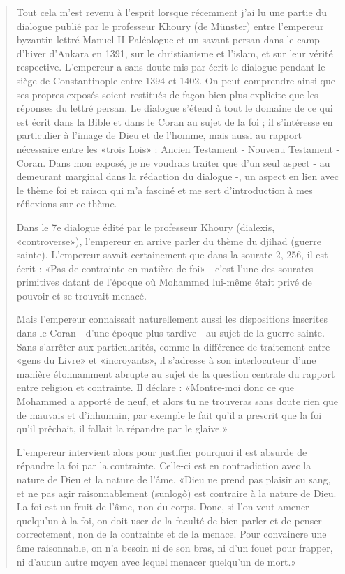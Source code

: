 \begin{quote}
Tout cela m'est revenu à l'esprit lorsque récemment j'ai lu une partie du dialogue publié par le professeur Khoury (de Münster) entre l'empereur byzantin lettré Manuel II Paléologue et un savant persan dans le camp d'hiver d'Ankara en 1391, sur le christianisme et l'islam, et sur leur vérité respective. L'empereur a sans doute mis par écrit le dialogue pendant le siège de Constantinople entre 1394 et 1402. On peut comprendre ainsi que ses propres exposés soient restitués de façon bien plus explicite que les réponses du lettré persan. Le dialogue s'étend à tout le domaine de ce qui est écrit dans la Bible et dans le Coran au sujet de la foi ; il s'intéresse en particulier à l'image de Dieu et de l'homme, mais aussi au rapport nécessaire entre les «trois Lois» : Ancien Testament - Nouveau Testament - Coran. Dans mon exposé, je ne voudrais traiter que d'un seul aspect - au demeurant marginal dans la rédaction du dialogue -, un aspect en lien avec le thème foi et raison qui m'a fasciné et me sert d'introduction à mes réflexions sur ce thème.

Dans le 7e dialogue édité par le professeur Khoury (dialexis, «controverse»), l'empereur en arrive parler du thème du djihad (guerre sainte). L'empereur savait certainement que dans la sourate 2, 256, il est écrit : «Pas de contrainte en matière de foi» - c'est l'une des sourates primitives datant de l'époque où Mohammed lui-même était privé de pouvoir et se trouvait menacé.

Mais l'empereur connaissait naturellement aussi les dispositions inscrites dans le Coran - d'une époque plus tardive - au sujet de la guerre sainte. Sans s'arrêter aux particularités, comme la différence de traitement entre «gens du Livre» et «incroyants», il s'adresse à son interlocuteur d'une manière étonnamment abrupte au sujet de la question centrale du rapport entre religion et contrainte. Il déclare : «Montre-moi donc ce que Mohammed a apporté de neuf, et alors tu ne trouveras sans doute rien que de mauvais et d'inhumain, par exemple le fait qu'il a prescrit que la foi qu'il prêchait, il fallait la répandre par le glaive.»

L'empereur intervient alors pour justifier pourquoi il est absurde de répandre la foi par la contrainte. Celle-ci est en contradiction avec la nature de Dieu et la nature de l'âme. «Dieu ne prend pas plaisir au sang, et ne pas agir raisonnablement (sunlogô) est contraire à la nature de Dieu. La foi est un fruit de l'âme, non du corps. Donc, si l'on veut amener quelqu'un à la foi, on doit user de la faculté de bien parler et de penser correctement, non de la contrainte et de la menace. Pour convaincre une âme raisonnable, on n'a besoin ni de son bras, ni d'un fouet pour frapper, ni d'aucun autre moyen avec lequel menacer quelqu'un de mort.»


\end{quote}
